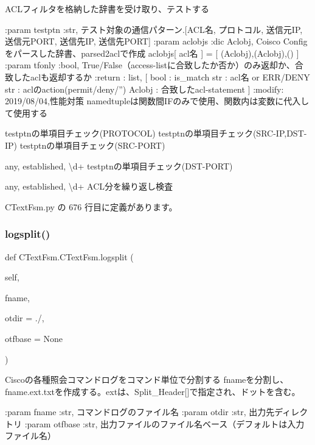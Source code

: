 \begin{DoxyVerb}ACLフィルタを格納した辞書を受け取り、テストする

:param testptn :str, テスト対象の通信パターン.[ACL名, プロトコル, 送信元IP, 送信元PORT, 送信先IP, 送信先PORT]
:param aclobjs :dic Aclobj, Coisco Configをパースした辞書、parsed2aclで作成
       aclobjs[ acl名 ] = [ (Aclobj),(Aclobj),() ]
:param tfonly  :bool, True/False（access-listに合致したか否か）のみ返却か、合致したaclも返却するか
:return : list,
  [
  bool   : is_match
  str    : acl名 or ERR/DENY
  str    : aclのaction(permit/deny/'')
  Aclobj : 合致したacl-statement
  ]
:modify: 2019/08/04,性能対策
  namedtupleは関数間IFのみで使用、関数内は変数に代入して使用する
\end{DoxyVerb}
 testptnの単項目チェック(\+P\+R\+O\+T\+O\+C\+O\+L) testptnの単項目チェック(S\+R\+C-\/\+IP,D\+S\+T-\/\+IP) testptnの単項目チェック(S\+R\+C-\/\+P\+O\+RT)

any, established, \textbackslash{}d+ testptnの単項目チェック(D\+S\+T-\/\+P\+O\+RT)

any, established, \textbackslash{}d+ A\+C\+L分を繰り返し検査 

 C\+Text\+Fsm.\+py の 676 行目に定義があります。

\mbox{\label{classCTextFsm_1_1CTextFsm_a1ecfc2994e306a0ae4a8670e651f8258}} 
\subsubsection{\texorpdfstring{logsplit()}{logsplit()}}
{\footnotesize\ttfamily def C\+Text\+Fsm.\+C\+Text\+Fsm.\+logsplit (\begin{DoxyParamCaption}\item[{}]{self,  }\item[{}]{fname,  }\item[{}]{otdir = {\ttfamily \textquotesingle{}./\textquotesingle{}},  }\item[{}]{otfbase = {\ttfamily None} }\end{DoxyParamCaption})}

\begin{DoxyVerb}Ciscoの各種照会コマンドログをコマンド単位で分割する
fnameを分割し、fname.ext.txtを作成する。extは、Split_Header[]で指定され、ドットを含む。

:param fname   :str, コマンドログのファイル名
:param otdir   :str, 出力先ディレクトリ
:param otfbase :str, 出力ファイルのファイル名ベース（デフォルトは入力ファイル名）
\end{DoxyVerb}
 

